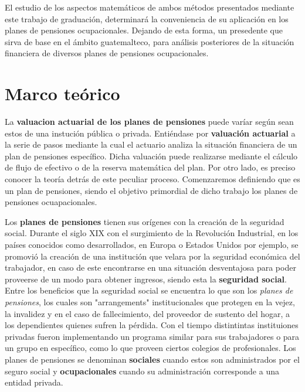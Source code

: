 \documentclass[12pt,letterpaper,titlepage]{article}
\begin{document}
El estudio de los aspectos matemáticos de ambos métodos presentados mediante este trabajo de graduación, determinará la conveniencia de su aplicación en los planes de pensiones ocupacionales. Dejando de esta forma, un presedente que sirva de base en el ámbito guatemalteco, para análisis posteriores de la situación financiera de diversos planes de pensiones ocupacionales.



\newpage

\section{Marco teórico}

La \textbf{valuacion actuarial de los planes de pensiones} puede varíar según sean estos de una instución pública o privada. Entiéndase por \textbf{valuación actuarial} a la serie de pasos mediante la cual el actuario analiza la situación financiera de un plan de pensiones específico. Dicha valuación puede realizarse mediante el cálculo de flujo de efectivo o de la reserva matemática del plan. Por otro lado, es preciso conocer la teoría detrás de este peculiar proceso. Comenzaremos definiendo que es un plan de pensiones, siendo el objetivo primordial de dicho trabajo los planes de pensiones ocuapacionales. 

Los \textbf{planes de pensiones} tienen sus orígenes con la creación de la seguridad social. Durante el siglo XIX con el surgimiento de la Revolución Industrial, en los países conocidos como desarrollados, en Europa o Estados Unidos por ejemplo,  se promovió la creación de una institución que velara por la seguridad económica del trabajador, en caso de este encontrarse en una situación desventajosa para poder proveerse de un modo para obtener ingresos, siendo esta la \textbf{seguridad social}. Entre los beneficios que la seguridad social se encuentra lo que son los \textit{planes de pensiones}, los cuales son "arrangements" institucionales que protegen en la vejez, la invalidez y en el caso de fallecimiento, del proveedor de sustento del hogar, a los dependientes quienes sufren la pérdida. Con el tiempo distintintas instituiones privadas fueron implementando un programa similar para sus trabajadores o para un grupo en específico, como lo que proveen ciertos colegios de profesionales. Los planes de pensiones se denominan \textbf{sociales} cuando estos son administrados por el seguro social y \textbf{ocupacionales} cuando su administración corresponde a una entidad privada.
\end{document}
